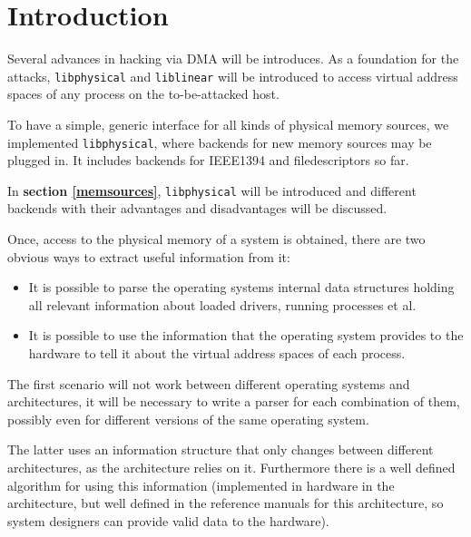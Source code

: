%
%

\section{Introduction}

Several advances in hacking via DMA will be introduces. As a foundation for the
attacks, \texttt{libphysical} and \texttt{liblinear} will be introduced to
access virtual address spaces of any process on the to-be-attacked host.



To have a simple, generic interface for all kinds of physical memory sources, we
implemented \texttt{libphysical}, where backends for new memory sources may be
plugged in. It includes backends for IEEE1394 and filedescriptors so far.

In \textbf{section \ref{memsources}}, \texttt{libphysical} will be introduced
and different backends with their advantages and disadvantages will be
discussed.



Once, access to the physical memory of a system is obtained, there are two
obvious ways to extract useful information from it:

\begin{itemize}

	\item It is possible to parse the operating systems internal data
	structures holding all relevant information about loaded drivers,
	running processes et al.
	
	\item It is possible to use the information that the operating system
	provides to the hardware to tell it about the virtual address spaces of
	each process.
	
\end{itemize}

The first scenario will not work between different operating systems and
architectures, it will be necessary to write a parser for each combination of
them, possibly even for different versions of the same operating system.

The latter uses an information structure that only changes between different
architectures, as the architecture relies on it. Furthermore there is a well
defined algorithm for using this information (implemented in hardware in the
architecture, but well defined in the reference manuals for this architecture,
so system designers can provide valid data to the hardware).

